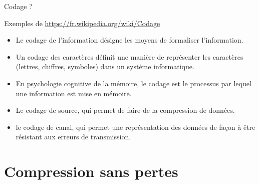 \documentclass[9pt, aspectratio=169]{beamer}
\begin{document}
\begin{frame}{\og Codage \fg{} ?} %

\begin{myblockblue}{Exemples de \url{https://fr.wikipedia.org/wiki/Codage}}
	  \begin{itemize}
     \item Le codage de l'information désigne les moyens de formaliser l'information.
     \item Un codage des caractères définit une manière de représenter les caractères (lettres, chiffres, symboles) dans un système informatique.
    \item En psychologie cognitive de la mémoire, le codage est le processus par lequel une information est mise en mémoire.
    \item Le codage de source, qui permet de faire de la compression de données.
    \item le codage de canal, qui permet une représentation des données de façon à être résistant aux erreurs de transmission.
 \end{itemize}
\end{myblockblue}
    
\end{frame}

\section{Compression sans pertes}

\begin{frame}{} %
\begin{center}
\Huge \insertsection
\end{center}
\end{frame}
\end{document}
